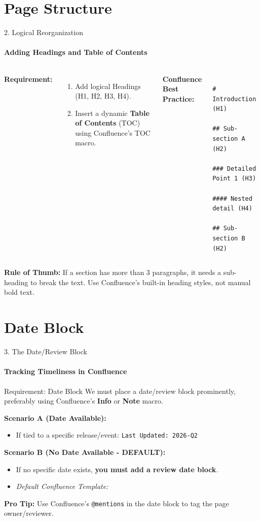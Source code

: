 \documentclass[10pt, aspectratio=169]{beamer}
\begin{document}
	\section{Page Structure}
	\begin{frame}[fragile]{2. Logical Reorganization}
		\framesubtitle{Adding Headings and Table of Contents}
		\begin{columns}[T]
			\textbf{Requirement:}
			\begin{enumerate}
				\item Add logical Headings (H1, H2, H3, H4).
				\item Insert a dynamic \textbf{Table of Contents} (TOC) using Confluence's TOC macro.
			\end{enumerate}
			\textbf{Confluence Best Practice:}
			\begin{verbatim}
				# Introduction (H1)
				## Sub-section A (H2)
				### Detailed Point 1 (H3)
				#### Nested detail (H4)
				## Sub-section B (H2)
			\end{verbatim}
		\end{columns}
		\pause
		\vfill
		\textbf{Rule of Thumb:} If a section has more than 3 paragraphs, it needs a sub-heading to break the text. Use Confluence's built-in heading styles, not manual bold text.
	\end{frame}
	
	\section{Date Block}
	\begin{frame}{3. The Date/Review Block}
		\framesubtitle{Tracking Timeliness in Confluence}
		\begin{block}{Requirement: Date Block}
			We must place a date/review block prominently, preferably using Confluence's \textbf{Info} or \textbf{Note} macro.
		\end{block}
		\pause
		\textbf{Scenario A (Date Available):}
		\begin{itemize}
			\item If tied to a specific release/event: \texttt{Last Updated: 2026-Q2}
		\end{itemize}
		\pause
		\textbf{Scenario B (No Date Available - DEFAULT):}
		\begin{itemize}
			\item If no specific date exists, \textbf{you must add a review date block}.
			\item \textit{Default Confluence Template:} 
		\end{itemize}
		\pause
		\begin{center}
		\end{center}
		\vspace{0.3cm}
		\pause
		\textbf{Pro Tip:} Use Confluence's \texttt{@mentions} in the date block to tag the page owner/reviewer.
	\end{frame}
	
\end{document}
